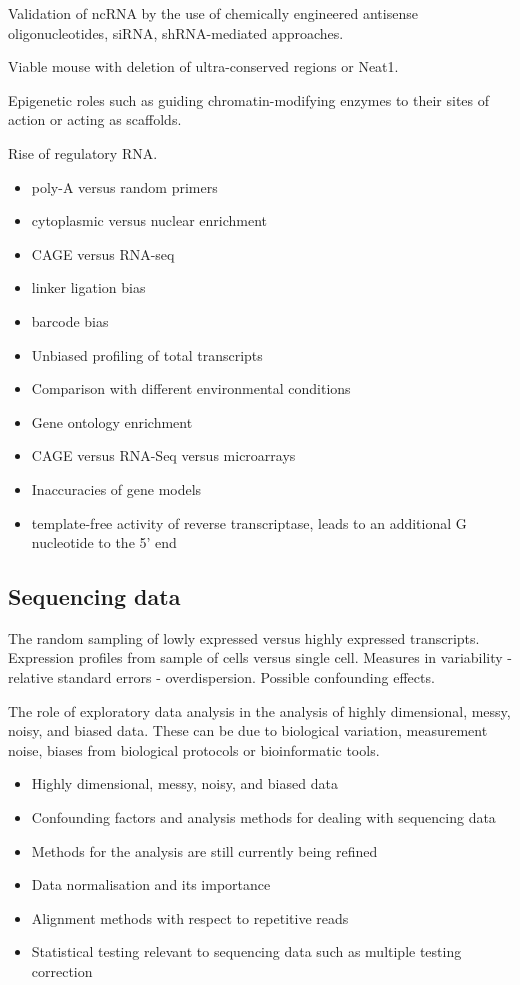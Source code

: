 Validation of ncRNA by the use of chemically engineered antisense oligonucleotides, siRNA, shRNA-mediated approaches.

Viable mouse with deletion of ultra-conserved regions\cite{pmid17803355} or Neat1\cite{pmid21444682}.

Epigenetic roles such as guiding chromatin-modifying enzymes to their sites of action or acting as scaffolds.

Rise of regulatory RNA\cite{Morris2014}.

\begin{itemize}
   \item poly-A versus random primers
   \item cytoplasmic versus nuclear enrichment
   \item CAGE versus RNA-seq
   \item linker ligation bias
   \item barcode bias
\end{itemize}

\begin{itemize}
   \item Unbiased profiling of total transcripts
   \item Comparison with different environmental conditions
   \item Gene ontology enrichment
   \item CAGE versus RNA-Seq versus microarrays\cite{pmid24676093}
   \item Inaccuracies of gene models
   \item template-free activity of reverse transcriptase, leads to an additional G nucleotide to the 5' end
\end{itemize}

\subsection{Sequencing data}

The random sampling of lowly expressed versus highly expressed transcripts. Expression profiles from sample of cells versus single cell. Measures in variability - relative standard errors - overdispersion. Possible confounding effects.

The role of exploratory data analysis in the analysis of highly dimensional, messy, noisy, and biased data. These can be due to biological variation, measurement noise, biases from biological protocols or bioinformatic tools.

\begin{itemize}
   \item Highly dimensional, messy, noisy, and biased data
   \item Confounding factors and analysis methods for dealing with sequencing data
   \item Methods for the analysis are still currently being refined
   \item Data normalisation and its importance
   \item Alignment methods with respect to repetitive reads
   \item Statistical testing relevant to sequencing data such as multiple testing correction
\end{itemize}

